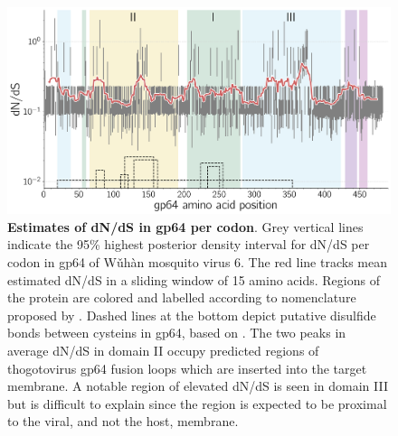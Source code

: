 \documentclass[11pt,twocolumn]{article}
\begin{document}
\begin{figure}
\centering
\includegraphics[width=\textwidth]{SuppFig5_sitewiseDNDS.png}
\caption{
\textbf{Estimates of dN/dS in gp64 per codon}.
Grey vertical lines indicate the 95\% highest posterior density interval for dN/dS per codon in gp64 of W\v{u}h\`{a}n mosquito virus 6.
The red line tracks mean estimated dN/dS in a sliding window of 15 amino acids.
Regions of the protein are colored and labelled according to nomenclature proposed by \cite{garry_proteomics_2008}.
Dashed lines at the bottom depict putative disulfide bonds between cysteins in gp64, based on \cite{garry_proteomics_2008}.
The two peaks in average dN/dS in domain II occupy predicted regions of thogotovirus gp64 fusion loops which are inserted into the target membrane.
A notable region of elevated dN/dS is seen in domain III but is difficult to explain since the region is expected to be proximal to the viral, and not the host, membrane.
}
\end{figure}
\end{document}
